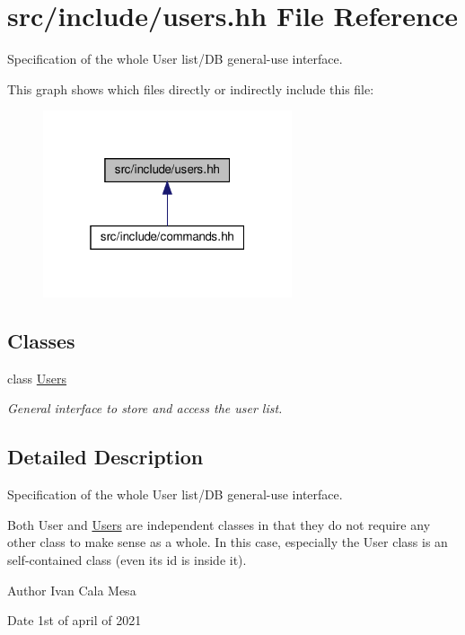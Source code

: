 \hypertarget{users_8hh}{}\section{src/include/users.hh File Reference}
\label{users_8hh}


Specification of the whole User list/\+DB general-\/use interface.  


This graph shows which files directly or indirectly include this file\+:
\nopagebreak
\begin{figure}[H]
\begin{center}
\leavevmode
\includegraphics[width=208pt]{users_8hh__dep__incl}
\end{center}
\end{figure}
\subsection*{Classes}
\begin{DoxyCompactItemize}
\item 
class \hyperlink{classUsers}{Users}
\begin{DoxyCompactList}\small\item\em General interface to store and access the user list. \end{DoxyCompactList}\end{DoxyCompactItemize}


\subsection{Detailed Description}
Specification of the whole User list/\+DB general-\/use interface. 

Both User and \hyperlink{classUsers}{Users} are \textquotesingle{}independent\textquotesingle{} classes in that they do not require any other class to make sense as a whole. In this case, especially the User class is an self-\/contained class (even its id is inside it). \begin{DoxyAuthor}{Author}
Ivan Cala Mesa 
\end{DoxyAuthor}
\begin{DoxyDate}{Date}
1st of april of 2021 
\end{DoxyDate}
